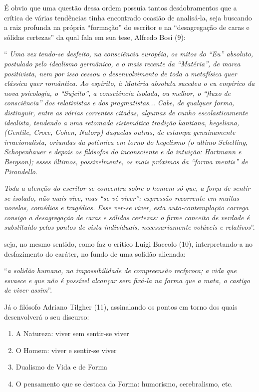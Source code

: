 É obvio que uma questão dessa ordem possuía tantos desdobramentos que a
crítica de várias tendências tinha encontrado ocasião de analisá-la,
seja buscando a raiz profunda na própria ``formação'' do escritor e na
``desagregação de caras e sólidas certezas'' da qual fala em sua tese,
Alfredo Bosi (9):

`` \emph{Uma vez tendo-se desfeito, na consciência européia, os mitos do
``Eu'' absoluto, postulado pelo idealismo germânico, e o mais recente da
``Matéria'', de marca positivista, nem por isso cessou o desenvolvimento
de toda a metafísica quer clássica quer romântica. Ao espírito, à
Matéria absoluta sucedeu o eu empírico da nova psicologia, o
``Sujeito'', a consciência isolada, ou melhor, o ``fluxo de
consciência'' dos relativistas e dos pragmatistas... Cabe, de qualquer
forma, distinguir, entre as várias correntes citadas, algumas de cunho
escolasticamente idealista, tendendo a uma retomada sistemática tradição
kantiana, hegeliana, (Gentile, Croce, Cohen, Natorp) daquelas outras, de
estampa genuinamente irracionalista, oriundas da polêmica em torno do
hegelismo (o ultimo Schelling, Schopenhauer e depois os filósofos do
inconsciente e da intuição: Hartmann e Bergson); esses últimos,
possivelmente, os mais próximos da ``forma mentis'' de Pirandello. }

\emph{Toda a atenção do escritor se concentra sobre o homem só que, a
força de sentir-se isolado, não mais vive, mas ``se vê viver'':
expressão recorrente em muitas novelas, comédias e tragédias. Esse
ver-se viver, esta auto-contemplação carrega consigo a desagregação de
caras e sólidas certezas: o firme conceito de verdade é substituído
pelos pontos de vista individuais, necessariamente volúveis e
relativos}''.

seja, no mesmo sentido, como faz o crítico Luigi Baccolo (10),
interpretando-a no desfazimento do caráter, no fundo de uma solidão
alienada:

``\emph{a solidão humana, na impossibilidade de compreensão recíproca; a
vida que esvaece e que não é possível alcançar sem fixá-la na forma que
a mata, o castigo de viver assim}''.

Já o filósofo Adriano Tilgher (11), assinalando os pontos em torno dos
quais desenvolverá o seu discurso:

\begin{enumerate}
\def\labelenumi{\arabic{enumi}.}
\item
  A Natureza: viver sem sentir-se viver
\item
  O Homem: viver e sentir-se viver
\item
  Dualismo de Vida e de Forma
\item
  O pensamento que se destaca da Forma: humorismo, cerebralismo, etc.
\end{enumerate}

